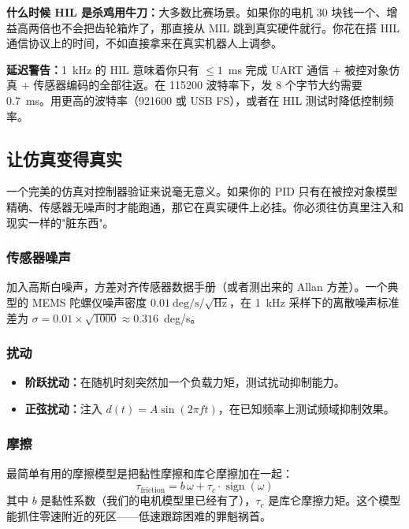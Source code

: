 \textbf{什么时候 HIL 是杀鸡用牛刀：}大多数比赛场景。如果你的电机 30 块钱一个、增益高两倍也不会把齿轮箱炸了，那直接从 MIL 跳到真实硬件就行。你花在搭 HIL 通信协议上的时间，不如直接拿来在真实机器人上调参。

\textbf{延迟警告：}1~kHz 的 HIL 意味着你只有 $\leq 1$~ms 完成 UART 通信 + 被控对象仿真 + 传感器编码的全部往返。在 115200 波特率下，发 8 个字节大约需要 0.7~ms。用更高的波特率（921600 或 USB FS），或者在 HIL 测试时降低控制频率。

\subsection{让仿真变得真实}

一个完美的仿真对控制器验证来说毫无意义。如果你的 PID 只有在被控对象模型精确、传感器无噪声时才能跑通，那它在真实硬件上必挂。你必须往仿真里注入和现实一样的"脏东西"。

\subsubsection{传感器噪声}

加入高斯白噪声，方差对齐传感器数据手册（或者测出来的 Allan 方差）。一个典型的 MEMS 陀螺仪噪声密度 $0.01~\text{deg/s}/\sqrt{\text{Hz}}$，在 1~kHz 采样下的离散噪声标准差为 $\sigma = 0.01 \times \sqrt{1000} \approx 0.316$~deg/s。

\subsubsection{扰动}

\begin{itemize}
    \item \textbf{阶跃扰动：}在随机时刻突然加一个负载力矩，测试扰动抑制能力。
    \item \textbf{正弦扰动：}注入 $d(t) = A\sin(2\pi f t)$，在已知频率上测试频域抑制效果。
\end{itemize}

\subsubsection{摩擦}

最简单有用的摩擦模型是把黏性摩擦和库仑摩擦加在一起：
\begin{equation}
\tau_{\text{friction}} = b\,\omega + \tau_c \cdot \operatorname{sign}(\omega)
\end{equation}
其中 $b$ 是黏性系数（我们的电机模型里已经有了），$\tau_c$ 是库仑摩擦力矩。这个模型能抓住零速附近的死区——低速跟踪困难的罪魁祸首。

